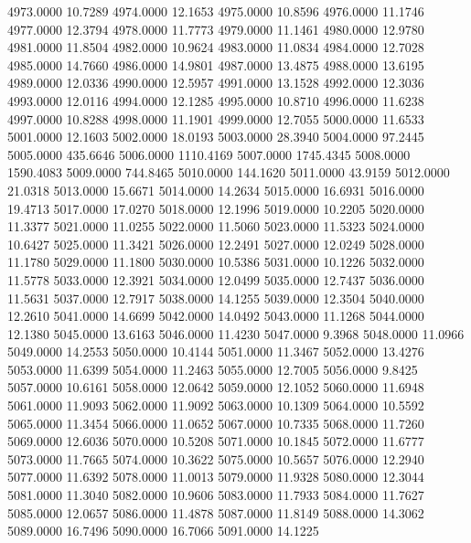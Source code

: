 4973.0000     10.7289
4974.0000     12.1653
4975.0000     10.8596
4976.0000     11.1746
4977.0000     12.3794
4978.0000     11.7773
4979.0000     11.1461
4980.0000     12.9780
4981.0000     11.8504
4982.0000     10.9624
4983.0000     11.0834
4984.0000     12.7028
4985.0000     14.7660
4986.0000     14.9801
4987.0000     13.4875
4988.0000     13.6195
4989.0000     12.0336
4990.0000     12.5957
4991.0000     13.1528
4992.0000     12.3036
4993.0000     12.0116
4994.0000     12.1285
4995.0000     10.8710
4996.0000     11.6238
4997.0000     10.8288
4998.0000     11.1901
4999.0000     12.7055
5000.0000     11.6533
5001.0000     12.1603
5002.0000     18.0193
5003.0000     28.3940
5004.0000     97.2445
5005.0000    435.6646
5006.0000    1110.4169
5007.0000    1745.4345
5008.0000    1590.4083
5009.0000    744.8465
5010.0000    144.1620
5011.0000     43.9159
5012.0000     21.0318
5013.0000     15.6671
5014.0000     14.2634
5015.0000     16.6931
5016.0000     19.4713
5017.0000     17.0270
5018.0000     12.1996
5019.0000     10.2205
5020.0000     11.3377
5021.0000     11.0255
5022.0000     11.5060
5023.0000     11.5323
5024.0000     10.6427
5025.0000     11.3421
5026.0000     12.2491
5027.0000     12.0249
5028.0000     11.1780
5029.0000     11.1800
5030.0000     10.5386
5031.0000     10.1226
5032.0000     11.5778
5033.0000     12.3921
5034.0000     12.0499
5035.0000     12.7437
5036.0000     11.5631
5037.0000     12.7917
5038.0000     14.1255
5039.0000     12.3504
5040.0000     12.2610
5041.0000     14.6699
5042.0000     14.0492
5043.0000     11.1268
5044.0000     12.1380
5045.0000     13.6163
5046.0000     11.4230
5047.0000      9.3968
5048.0000     11.0966
5049.0000     14.2553
5050.0000     10.4144
5051.0000     11.3467
5052.0000     13.4276
5053.0000     11.6399
5054.0000     11.2463
5055.0000     12.7005
5056.0000      9.8425
5057.0000     10.6161
5058.0000     12.0642
5059.0000     12.1052
5060.0000     11.6948
5061.0000     11.9093
5062.0000     11.9092
5063.0000     10.1309
5064.0000     10.5592
5065.0000     11.3454
5066.0000     11.0652
5067.0000     10.7335
5068.0000     11.7260
5069.0000     12.6036
5070.0000     10.5208
5071.0000     10.1845
5072.0000     11.6777
5073.0000     11.7665
5074.0000     10.3622
5075.0000     10.5657
5076.0000     12.2940
5077.0000     11.6392
5078.0000     11.0013
5079.0000     11.9328
5080.0000     12.3044
5081.0000     11.3040
5082.0000     10.9606
5083.0000     11.7933
5084.0000     11.7627
5085.0000     12.0657
5086.0000     11.4878
5087.0000     11.8149
5088.0000     14.3062
5089.0000     16.7496
5090.0000     16.7066
5091.0000     14.1225
